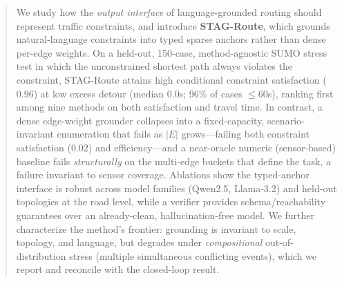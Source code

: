 \begin{abstract}
We study how the \emph{output interface} of language-grounded routing should represent traffic
constraints, and introduce \textbf{STAG-Route}, which grounds natural-language constraints into typed
sparse anchors rather than dense per-edge weights. On a held-out, 150-case, method-agnostic SUMO stress
test in which the unconstrained shortest path always violates the constraint, STAG-Route attains high
conditional constraint satisfaction ($0.96$) at low excess detour (median $0.0$s; 96\% of cases $\le 60$s),
ranking first among nine methods on both satisfaction and travel time. In contrast, a dense edge-weight
grounder collapses into a fixed-capacity, scenario-invariant enumeration that fails as $|E|$ grows---failing
both constraint satisfaction ($0.02$) and efficiency---and a near-oracle numeric (sensor-based) baseline fails \emph{structurally} on
the multi-edge buckets that define the task, a failure invariant to sensor coverage. Ablations show the
typed-anchor interface is robust across model families (Qwen2.5, Llama-3.2) and held-out topologies at the
road level, while a verifier provides schema/reachability guarantees over an already-clean,
hallucination-free model. We further characterize the method's frontier: grounding is invariant to scale,
topology, and language, but degrades under \emph{compositional} out-of-distribution stress (multiple
simultaneous conflicting events), which we report and reconcile with the closed-loop result.
\end{abstract}

